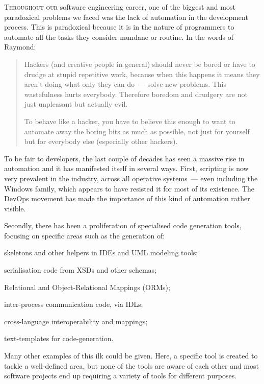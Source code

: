 \documentclass{book}
\begin{document}
\lettrine{T}{hroughout our} software engineering career, one of the
biggest and most paradoxical problems we faced was the lack of
automation in the development process. This is paradoxical because it
is in the nature of programmers to automate all the tasks they
consider mundane or routine. In the words of
Raymond\cite{Raymond:2015}:

\begin{quote}
Hackers (and creative people in general) should never be bored or have
to drudge at stupid repetitive work, because when this happens it
means they aren't doing what only they can do~--- solve new
problems. This wastefulness hurts everybody. Therefore boredom and
drudgery are not just unpleasant but actually evil.

To behave like a hacker, you have to believe this enough to want to
automate away the boring bits as much as possible, not just for
yourself but for everybody else (especially other hackers).
\end{quote}

To be fair to developers, the last couple of decades has seen a
massive rise in automation and it has manifested itself in several
ways. First, scripting is now very prevalent in the industry, across
all operative systems~--- even including the Windows family, which
appears to have resisted it for most of its existence. The DevOps
movement has made the importance of this kind of automation rather
visible.

Secondly, there has been a proliferation of specialised code
generation tools, focusing on specific areas such as the generation
of:
\begin{enumerate*}[label=(\roman*)]
\item skeletons and other helpers in IDEs and UML modeling tools;
\item serialisation code from XSDs and other schemas;
\item Relational and Object-Relational Mappings (ORMs);
\item inter-process communication code, via IDLs;
\item cross-language interoperability and mappings;
\item text-templates for code-generation.
\end{enumerate*}
Many other examples of this ilk could be given. Here, a specific tool
is created to tackle a well-defined area, but none of the tools are
aware of each other and most software projects end up requiring a
variety of tools for different purposes.
\end{document}
